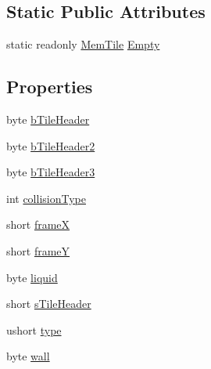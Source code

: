 \subsection*{Static Public Attributes}
\begin{DoxyCompactItemize}
\item 
static readonly \hyperlink{classOTA_1_1Memory_1_1MemTile}{Mem\+Tile} \hyperlink{classOTA_1_1Memory_1_1MemTile_a45dc1ca0468c765c9556928b75fc96ab}{Empty}
\end{DoxyCompactItemize}
\subsection*{Properties}
\begin{DoxyCompactItemize}
\item 
byte \hyperlink{classOTA_1_1Memory_1_1MemTile_aee0c68081277260b581b80b76a7f7f38}{b\+Tile\+Header}
\item 
byte \hyperlink{classOTA_1_1Memory_1_1MemTile_a97f492c02d1e00b0605fbd21409d14bb}{b\+Tile\+Header2}
\item 
byte \hyperlink{classOTA_1_1Memory_1_1MemTile_a8ecc61a684451acc5906bf3ef999d9b4}{b\+Tile\+Header3}
\item 
int \hyperlink{classOTA_1_1Memory_1_1MemTile_a8bc8c22d31ad6526a6e6defa5bc21bd4}{collision\+Type}
\item 
short \hyperlink{classOTA_1_1Memory_1_1MemTile_a068507d53910a4568c2fc07d93b41c9a}{frame\+X}
\item 
short \hyperlink{classOTA_1_1Memory_1_1MemTile_a430e170df428f2cb5a743ce89b400e9b}{frame\+Y}
\item 
byte \hyperlink{classOTA_1_1Memory_1_1MemTile_a21f98f1e87dc019f330250b4a98a0943}{liquid}
\item 
short \hyperlink{classOTA_1_1Memory_1_1MemTile_a4992a2d11be1557d0f104a9204d86219}{s\+Tile\+Header}
\item 
ushort \hyperlink{classOTA_1_1Memory_1_1MemTile_afa7787a68eb26fb33dc369c00db629ca}{type}
\item 
byte \hyperlink{classOTA_1_1Memory_1_1MemTile_a4ed736cd5ad29a9089e1cd84010565c3}{wall}
\end{DoxyCompactItemize}


